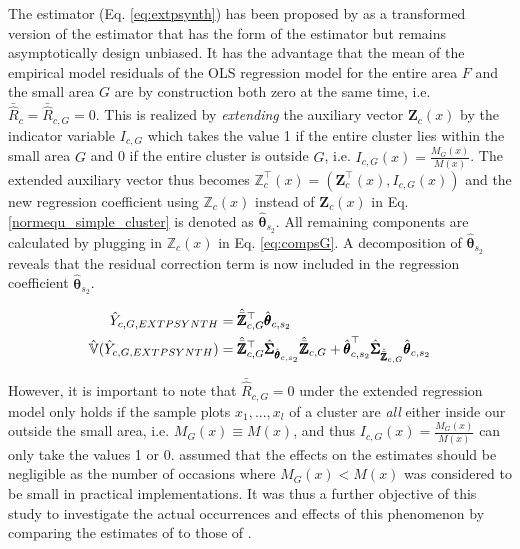 The \extpsynth{} estimator (Eq. \ref{eq:extpsynth}) has been proposed by \cite{mandallaz2013a} as a transformed version of the \psmall{} estimator that has the form of the \psynth{} estimator but remains asymptotically design unbiased. It has the advantage that the mean of the empirical model residuals of the OLS regression model for the entire area $F$ and the small area $G$ are by construction both zero at the same time, i.e. $\bar{\hat{R}}_{c} = \bar{\hat{R}}_{c,G} = 0$. This is realized by \textit{extending} the auxiliary vector $\pmb{Z}_{c}(x)$ by the indicator variable $I_{c,G}$ which takes the value 1 if the entire cluster lies within the small area $G$ and 0 if the entire cluster is outside $G$, i.e. $I_{c,G}(x)=\frac{M_{G}(x)}{M(x)}$. The extended auxiliary vector thus becomes $\pmb{\mathbb{Z}}_{c}^{\top}(x)= (\pmb{Z}_{c}^{\top}(x),I_{c,G}(x))$ and the new regression coefficient using $\pmb{\mathbb{Z}}_{c}(x)$ instead of $\pmb{Z}_{c}(x)$ in Eq. \ref{normequ_simple_cluster} is denoted as $\hat{\pmb{\theta}}_{s_2}$. All remaining components are calculated by plugging in $\pmb{\mathbb{Z}}_{c}(x)$ in Eq. \ref{eq:compsG}. A decomposition of $\hat{\pmb{\theta}}_{s_2}$ reveals that the residual correction term is now included in the regression coefficient $\hat{\pmb{\theta}}_{s_2}$.

\begin{subequations}\label{eq:extpsynth}
	\begin{align}
	\hat{Y}_{c,G,EXTPSYNTH} & =\hat{\bar{\pmb{\mathbb{Z}}}}_{c,G}^{\top}\hat{\pmb{\theta}}_{c,s_2} \label{eq:extpsynth_pest} \\
	\hat{\mathbb{V}}(\hat{Y}_{c,G,EXTPSYNTH})& =
	\hat{\bar{\pmb{\mathbb{Z}}}}_{c,G}^{\top}\hat{\pmb{\Sigma}}_{\hat{\pmb{\theta}}_{c,s_2}}
	\hat{\bar{\pmb{\mathbb{Z}}}}_{c,G}
	+ \hat{\pmb{\theta}}^{\top}_{c,s_2}\hat{\pmb{\Sigma}}_{\hat{\bar{\pmb{\mathbb{Z}}}}_{c,G}}\hat{\pmb{\theta}}_{c,s_2} \label{eq:extpsynth_var}
	\end{align}
\end{subequations}

However, it is important to note that $\bar{\hat{R}}_{c,G} = 0$ under the extended regression model only holds if the sample plots $x_1, ..., x_l$ of a cluster are \textit{all} either inside our outside the small area, i.e. $M_G(x)\equiv M(x)$, and thus $I_{c,G}(x)=\frac{M_{G}(x)}{M(x)}$ can only take the values 1 or 0. \citet{mandallaz2016} assumed that the effects on the estimates should be negligible as the number of occasions where $M_{G}(x) < M(x)$ was considered to be small in practical implementations. It was thus a further objective of this study to investigate the actual occurrences and effects of this phenomenon by comparing the estimates of \extpsynth{} to those of \psmall{}. %

